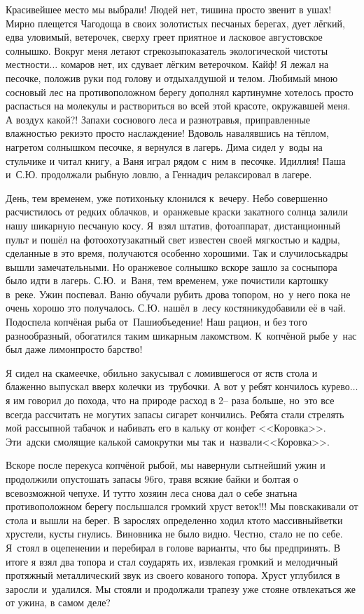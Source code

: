 Красивейшее место мы выбрали! Людей нет, тишина просто звенит в ушах! Мирно плещется Чагодоща в своих золотистых песчаных берегах, дует лёгкий, едва уловимый, ветерочек, сверху греет приятное и ласковое августовское солнышко. Вокруг меня летают стрекозы\mdash показатель экологической чистоты местности$\ldots$ комаров нет, их сдувает лёгким ветерочком. Кайф! Я лежал на песочке, положив руки под голову и отдыхал\mdash душой и телом. Любимый мною сосновый лес на противоположном берегу дополнял картину\mdash мне хотелось просто распасться на молекулы и раствориться во всей этой красоте, окружавшей меня. А воздух какой?! Запахи соснового леса и разнотравья, приправленные влажностью реки\mdash это просто наслаждение! Вдоволь навалявшись на тёплом, нагретом солнышком песочке, я вернулся в лагерь. Дима сидел у~воды на стульчике и читал книгу, а Ваня играл рядом с~ним в~песочке. Идиллия! Паша и~С.Ю. продолжали рыбную ловлю, а Геннадич релаксировал в лагере.

День, тем временем, уже потихоньку клонился к~вечеру. Небо совершенно расчистилось от редких облачков, и~оранжевые краски закатного солнца залили нашу шикарную песчаную косу. Я~взял штатив, фотоаппарат, дистанционный пульт и пошёл на фотоохоту\mdash закатный свет известен своей мягкостью и кадры, сделанные в это время, получаются особенно хорошими. Так и случилось\mdash кадры вышли замечательными. Но оранжевое солнышко вскоре зашло за сосны\mdash пора было идти в лагерь. С.Ю.~и~Ваня, тем временем, уже почистили картошку в~реке. Ужин поспевал. Ваню обучали рубить дрова топором, но~у него пока не очень хорошо это получалось. С.Ю. нашёл в~лесу костянику\mdash добавили её в чай. Подоспела копчёная рыба от~Паши\mdash объедение! Наш рацион, и без того разнообразный, обогатился таким шикарным лакомством. К~копчёной рыбе у~нас был даже лимон\mdash просто барство! 

Я сидел на скамеечке, обильно закусывал с ломившегося от яств стола и блаженно выпускал вверх колечки из~трубочки. А вот у ребят кончилось курево$\ldots$ я им говорил до похода, что на природе расход в 2\thinspace\nobreakdash-- раза больше, но~это все всегда рассчитать не могут\mdash их запасы сигарет кончились. Ребята стали стрелять мой рассыпной табачок и набивать его в кальку от конфет <<Коровка>>. Эти~адски смолящие калькой самокрутки мы так и~назвали\mdash <<Коровка>>. 

Вскоре после перекуса копчёной рыбой, мы навернули сытнейший ужин и продолжили опустошать запасы 96\sdash го, травя всякие байки и болтая о всевозможной чепухе. И тут\sdash то хозяин леса снова дал о себе знать\mdash на противоположном берегу послышался громкий хруст веток!!! Мы повскакивали от стола и вышли на берег. В зарослях определенно ходил кто\sdash то массивный\mdash ветки хрустели, кусты гнулись. Виновника не было видно. Честно, стало не по себе. Я~стоял в оцепенении и перебирал в голове варианты, что бы предпринять. В итоге я взял два топора и стал соударять их, извлекая громкий и мелодичный протяжный металлический звук из своего кованого топора. Хруст углубился в заросли и~удалился. Мы стояли и продолжали трапезу уже стоя\mdash не отвлекаться же от ужина, в самом деле? 


